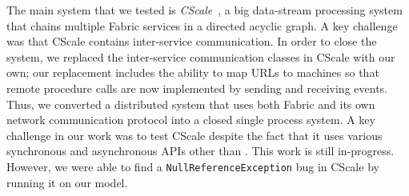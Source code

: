 
The main system that we tested is \emph{CScale}~\cite{X},
a big data-stream processing system that chains multiple Fabric services
in a directed acyclic graph.
A key challenge was that
CScale contains inter-service communication.
In order to close the system,
we replaced
the inter-service communication
classes in CScale with our own;
our replacement includes the ability to map
URLs to \psharp{} machines
so that remote procedure calls are now implemented
by sending and receiving \psharp{} events.
Thus,
we converted a distributed system
that uses both Fabric and its own
network communication protocol
into 
a closed single process system. 
A key challenge in our work
was to test CScale despite the fact that it
uses various synchronous and asynchronous APIs
other than \psharp{}.
This work is still in-progress.
However,
we were able to find a \texttt{NullReferenceException}
bug
in CScale
by running it on our model.











